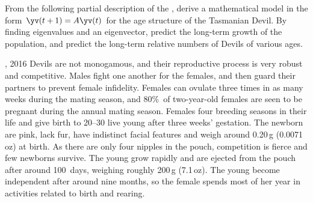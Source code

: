 \begin{exercise} \label{ex:} 
From the following partial description of the , 
derive a mathematical model in the form \(\yv(t+1)=A\yv(t)\) for the age structure of the Tasmanian Devil.
By finding eigenvalues and an eigenvector, predict the long-term growth of the population, and predict the long-term relative numbers of Devils of various ages.
\begin{quoted}{, 2016}
Devils are not monogamous, and their reproductive process is very robust and competitive. 
Males fight one another for the females, and then guard their partners to prevent female infidelity. 
Females can ovulate three times in as many weeks during the mating season, and 80\%~of two-year-old females are seen to be pregnant during the annual mating season. 
Females  four breeding seasons in their life and give birth to 20--30 live young after three weeks' gestation. 
The newborn are pink, lack fur, have indistinct facial features and weigh around 0.20\,g (0.0071\,oz) at birth. 
As there are only four nipples in the pouch, competition is fierce and few newborns survive. 
The young grow rapidly and are ejected from the pouch after around 100~days, weighing roughly 200\,g (7.1\,oz). 
The young become independent after around nine months, so the female spends most of her year in activities related to birth and rearing.
\end{quoted}
\end{exercise}






